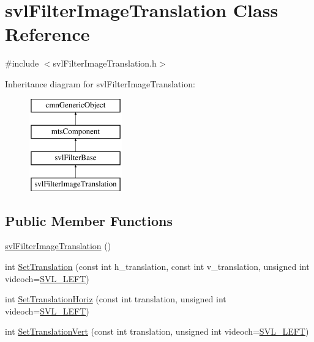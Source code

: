 \hypertarget{classsvl_filter_image_translation}{}\section{svl\+Filter\+Image\+Translation Class Reference}
\label{classsvl_filter_image_translation}


{\ttfamily \#include $<$svl\+Filter\+Image\+Translation.\+h$>$}

Inheritance diagram for svl\+Filter\+Image\+Translation\+:\begin{figure}[H]
\begin{center}
\leavevmode
\includegraphics[height=4.000000cm]{d8/d7b/classsvl_filter_image_translation}
\end{center}
\end{figure}
\subsection*{Public Member Functions}
\begin{DoxyCompactItemize}
\item 
\hyperlink{classsvl_filter_image_translation_a7c750ac0c96ead87e84ded5cb5f93f23}{svl\+Filter\+Image\+Translation} ()
\item 
int \hyperlink{classsvl_filter_image_translation_a5f184430b6401af4f36a348563ae0d0e}{Set\+Translation} (const int h\+\_\+translation, const int v\+\_\+translation, unsigned int videoch=\hyperlink{svl_definitions_8h_ab9fec7615f19c8df2919eebcab0b187f}{S\+V\+L\+\_\+\+L\+E\+F\+T})
\item 
int \hyperlink{classsvl_filter_image_translation_ab13887cd4932675ad37c26d3218672ca}{Set\+Translation\+Horiz} (const int translation, unsigned int videoch=\hyperlink{svl_definitions_8h_ab9fec7615f19c8df2919eebcab0b187f}{S\+V\+L\+\_\+\+L\+E\+F\+T})
\item 
int \hyperlink{classsvl_filter_image_translation_ab1fce914fed5d8f4352aff4f30675020}{Set\+Translation\+Vert} (const int translation, unsigned int videoch=\hyperlink{svl_definitions_8h_ab9fec7615f19c8df2919eebcab0b187f}{S\+V\+L\+\_\+\+L\+E\+F\+T})
\end{DoxyCompactItemize}
